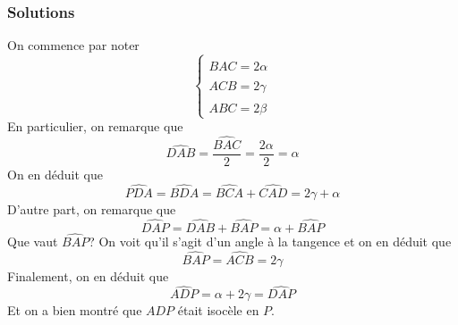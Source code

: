\subsubsection{Solutions}
\begin{sol}
\begin{center}
\end{center}

On commence par noter $$\left\{
    \begin{array}{ll}
        \widehat{BAC}=2\alpha\\
        \widehat{ACB}=2\gamma\\
        \widehat{ABC}=2\beta
    \end{array}
\right.$$
En particulier, on remarque que 
$$\widehat{DAB}=\frac{\widehat{BAC}}{2}=\frac{2\alpha}{2}=\alpha $$
On en déduit que 
$$\widehat{PDA}=\widehat{BDA}=\widehat{BCA}+\widehat{CAD}=2\gamma+\alpha $$
D'autre part, on remarque que 
$$\widehat{DAP}=\widehat{DAB}+\widehat{BAP}=\alpha+\widehat{BAP} $$
Que vaut $\widehat{BAP}$? On voit qu'il s'agit d'un angle à la tangence et on en déduit que 
$$ \widehat{BAP}=\widehat{ACB}=2\gamma$$
Finalement, on en déduit que 
$$\widehat{ADP}=\alpha+2\gamma=\widehat{DAP} $$
Et on a bien montré que $ADP$ était isocèle en $P$.
\end{sol}

